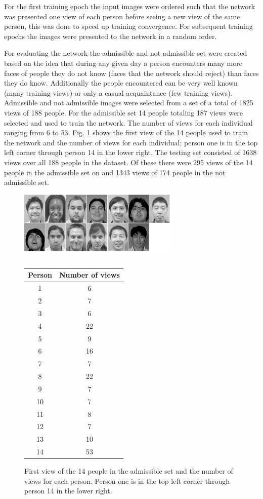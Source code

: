 \documentclass[conference]{IEEEtran}
\begin{document}
For the first training epoch the input images were ordered such that the network was presented one view of each person before seeing a new view of the same person, this was done to speed up training convergence.  For subsequent training epochs the images were presented to the network in a random order.

For evaluating the network the admissible and not admissible set were created based on the idea that during any given day a person encounters many more faces of people they do not know (faces that the network should reject) than faces they do know.  Additionally the people encountered can be very well known (many training views) or only a casual acquaintance (few training views).  Admissible and not admissible images were selected from a set of a total of 1825 views of 188 people.  For the admissible set 14 people totaling 187 views were selected and used to train the network. The number of views for each individual ranging from 6 to 53. Fig. \ref{fig:training} shows the first view of the 14 people used to train the network and the number of views for each individual; person one is in the top left corner through person 14 in the lower right. The testing set consisted of 1638 views over all 188 people in the dataset.  Of these there were 295 views of the 14 people in the admissible set on and 1343 views of 174 people in the not admissible set.  

\begin{figure}
\center
\fontsize{8}{12}\selectfont
\includegraphics[width=3in]{figs/training_faces.eps}
\begin{tabular}{c} \\[3ex] \end{tabular}
\begin{tabular}{|c|c|}
  \hline
  Person & Number of views\\
  \hline
  1 & 6\\
  2 & 7\\
  3 & 6\\
  4 & 22\\
  5 & 9\\
  6 & 16\\
  7 & 7\\
  8 & 22\\
  9 & 7\\
  10 & 7\\
  11 & 8\\
  12 & 7\\
  13 & 10\\
  14 & 53\\
  \hline
\end{tabular}
\caption{First view of the 14 people in the admissible set and the number of views for each person.  Person one is in the top left corner through person 14 in the lower right.}
\label{fig:training}
\end{figure}
\end{document}
